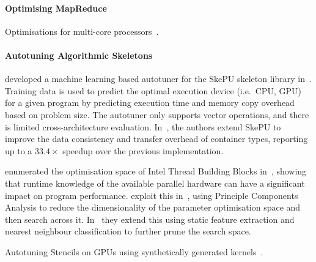 





\paragraph{Optimising MapReduce} Optimisations for multi-core
processors~\cite{Kaashoek2010}.


\paragraph{Autotuning Algorithmic Skeletons}
\citeauthor{Dastgeer2011} developed a machine learning based autotuner
for the SkePU skeleton library in~\cite{Dastgeer2011}. Training data
is used to predict the optimal execution device (i.e.\ CPU, GPU) for a
given program by predicting execution time and memory copy overhead
based on problem size. The autotuner only supports vector operations,
and there is limited cross-architecture
evaluation. In~\cite{Dastgeer2015a}, the authors extend SkePU to
improve the data consistency and transfer overhead of container types,
reporting up to a $33.4\times$ speedup over the previous
implementation.

\citeauthor{Contreras2008} enumerated the optimisation space of Intel
Thread Building Blocks in~\cite{Contreras2008}, showing that runtime
knowledge of the available parallel hardware can have a significant
impact on program performance. \citeauthor{Collins2012} exploit this
in~\cite{Collins2012}, using Principle Components Analysis to reduce
the dimensionality of the parameter optimisation space and then search
across it. In~\cite{Collins2013} they extend this using static feature
extraction and nearest neighbour classification to further prune the
search space.

Autotuning Stencils on GPUs using synthetically generated
kernels~\cite{Garvey2015b}.

